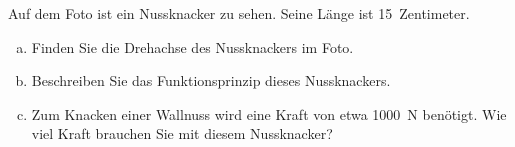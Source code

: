 
\begin{center}
\end{center}

\begin{aufgabe}
	Auf dem Foto ist ein Nussknacker zu sehen. Seine Länge ist \SI{15}{Zentimeter}.
	\begin{enumerate} [a)]
		\item Finden Sie die Drehachse des Nussknackers im Foto.
		\item Beschreiben Sie das Funktionsprinzip dieses Nussknackers.
		\item Zum Knacken einer Wallnuss wird eine Kraft von etwa \SI{1000}{N} benötigt. Wie viel Kraft brauchen Sie mit diesem Nussknacker?
	\end{enumerate}
\end{aufgabe}
